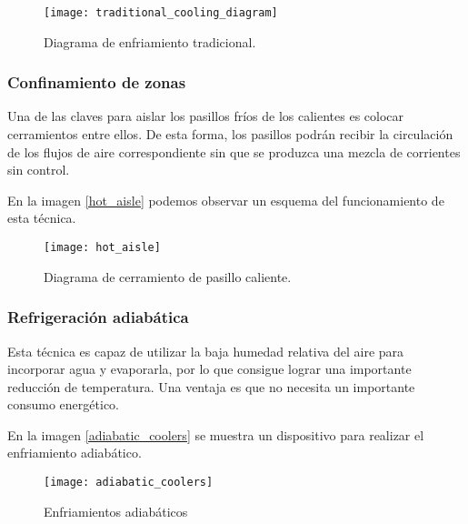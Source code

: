 \begin{figure}
    \begin{center}
        \texttt{[image: traditional\_cooling\_diagram]}
        \caption{Diagrama de enfriamiento tradicional.}
        \label{traditional_cooling}
    \end{center}
\end{figure}

\subsubsection{Confinamiento de zonas}

Una de las claves para aislar los pasillos fríos de los calientes es colocar cerramientos entre ellos. De esta forma, los pasillos podrán recibir la circulación de los flujos de aire correspondiente sin que se produzca una mezcla de corrientes sin control.

En la imagen \eqref{hot_aisle} podemos observar un esquema del funcionamiento de esta técnica.

\begin{figure}
    \begin{center}
        \texttt{[image: hot\_aisle]}
        \caption{Diagrama de cerramiento de pasillo caliente.}
        \label{hot_aisle}
    \end{center}
\end{figure}

\subsubsection{Refrigeración adiabática}

Esta técnica es capaz de utilizar la baja humedad relativa del aire para incorporar agua y evaporarla, por lo que consigue lograr una importante reducción de temperatura. Una ventaja es que no necesita un importante consumo energético.

En la imagen \eqref{adiabatic_coolers} se muestra un dispositivo para realizar el enfriamiento adiabático.

\begin{figure}
    \begin{center}
        \texttt{[image: adiabatic\_coolers]}
        \caption{Enfriamientos adiabáticos}
        \label{adiabatic_coolers}
    \end{center}
\end{figure}

